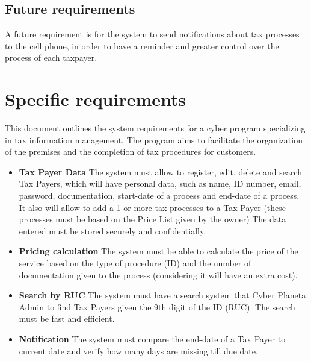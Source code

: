 \documentclass[12pt,a4paper, twosite]{article}
\begin{document}
\subsection{Future requirements}
\label{sec:org33cfcdb}

A future requirement is for the system to send notifications about tax processes to the cell phone, in order to have a reminder and greater control over the process of each taxpayer.   


\section{Specific requirements}
\label{sec:org40573d1}

This document outlines the system requirements for a cyber program specializing in tax information management. The program aims to facilitate the organization of the premises and the completion of tax procedures for customers.

\begin{itemize}
\item
\textbf {Tax Payer Data}
The system must allow to register, edit, delete and search Tax Payers, which will have personal data, such as name, ID number, email, password, documentation, start-date of a process and end-date of a process. It also will allow to add a 1 or more tax processes to a Tax Payer (these processes must be based on the Price List given by the owner)
The data entered must be stored securely and confidentially. 
\end{itemize}

\begin{itemize}
\item
\textbf {Pricing calculation}
The system must be able to calculate the price of the service based on the type of procedure (ID) and the number of documentation given to the process (considering it will have an extra cost).
\end{itemize}

\begin{itemize}
\item
\textbf {Search by RUC}
The system must have a search system that Cyber Planeta Admin to find Tax Payers given the 9th digit of the ID (RUC). 
The search must be fast and efficient. 
\end{itemize}

\begin{itemize}
\item
\textbf {Notification}
The system must compare the end-date of a Tax Payer to current date and verify how many days are missing till due date. 
\end{itemize}
\end{document}
